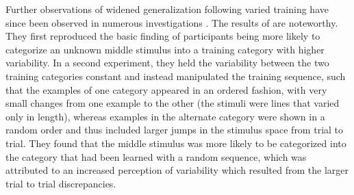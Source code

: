 \documentclass[
  12pt,
  letterpaper,
]{article}
\begin{document}
Further observations of widened generalization following varied training
have since been observed in numerous investigations
\autocites{hahnEffectsCategoryDiversity2005,perlmanFurtherAttemptsClarify2012,sakamotoPuttingPsychologyBack2008,hsuEffectsGenerativeDiscriminative2010,hoschPriorExperienceVariability2023}[but
see][]{stewartEffectCategoryVariability2002}[ and
\textcite{seitzModelingCategoryVariability2023}]{yangCategoryVariabilityEffect2014}.
The results of \textcite{sakamotoPuttingPsychologyBack2008} are
noteworthy. They first reproduced the basic finding of participants
being more likely to categorize an unknown middle stimulus into a
training category with higher variability. In a second experiment, they
held the variability between the two training categories constant and
instead manipulated the training sequence, such that the examples of one
category appeared in an ordered fashion, with very small changes from
one example to the other (the stimuli were lines that varied only in
length), whereas examples in the alternate category were shown in a
random order and thus included larger jumps in the stimulus space from
trial to trial. They found that the middle stimulus was more likely to
be categorized into the category that had been learned with a random
sequence, which was attributed to an increased perception of variability
which resulted from the larger trial to trial discrepancies.
\end{document}
